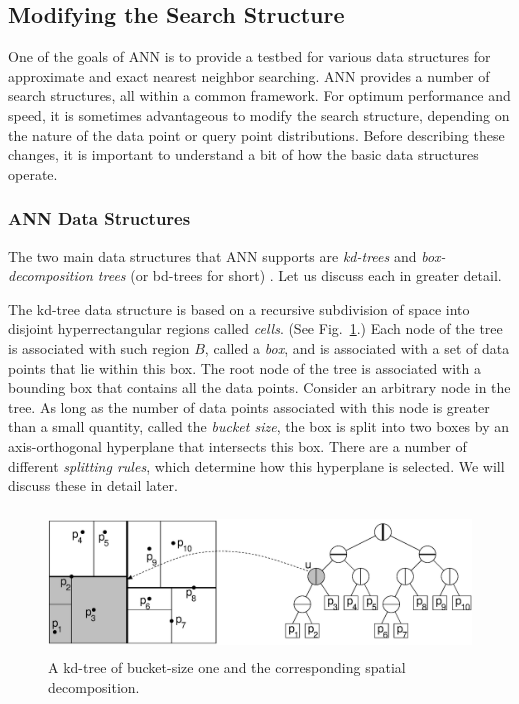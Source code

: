 \documentclass[11pt]{article}		%
\newcommand{\ANN}[0]{\textsf{ANN}}
\begin{document}
\subsection{Modifying the Search Structure}\label{struct2.sec}

One of the goals of {\ANN} is to provide a testbed for various data
structures for approximate and exact nearest neighbor searching.  {\ANN}
provides a number of search structures, all within a common framework.
For optimum performance and speed, it is sometimes advantageous to
modify the search structure, depending on the nature of the data point
or query point distributions.  Before describing these changes, it is
important to understand a bit of how the basic data structures operate.

\subsubsection{{\ANN} Data Structures}\label{structs.sec}

The two main data structures that {\ANN} supports are \emph{kd-trees}
\cite{Ben90,FBF77} and \emph{box-decomposition trees} (or bd-trees for
short) \cite{AMN98}.  Let us discuss each in greater detail.

The kd-tree data structure is based on a recursive subdivision of space
into disjoint hyperrectangular regions called \emph{cells}.  (See
Fig.~\ref{kd-tree.fig}.)  Each node of the tree is associated with such
region $B$, called a \emph{box}, and is associated with a set of data
points that lie within this box.  The root node of the tree is
associated with a bounding box that contains all the data points.
Consider an arbitrary node in the tree.  As long as the number of data
points associated with this node is greater than a small quantity,
called the \emph{bucket size}, the box is split into two boxes by an
axis-orthogonal hyperplane that intersects this box.  There are a number
of different \emph{splitting rules}, which determine how this hyperplane
is selected.  We will discuss these in detail later.

\begin{figure}[htbp]
  \centerline{\includegraphics[height=1.5in]{Figs/kd-tree.eps}}
  \caption{A kd-tree of bucket-size one and the corresponding spatial
  decomposition.}
  \label{kd-tree.fig}
\end{figure}
\end{document}
